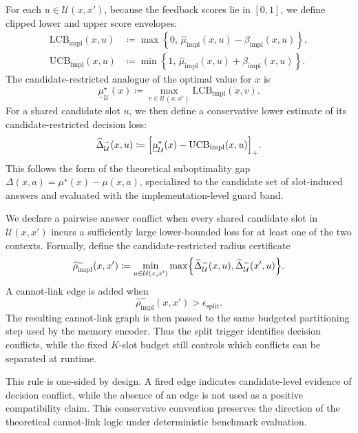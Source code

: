 \documentclass{article}
\theoremstyle{plain}
\theoremstyle{definition}
\theoremstyle{remark}
\begin{document}
For each \(u\in\mathcal U(x,x')\), because the feedback scores lie in
\([0,1]\), we define clipped lower and upper score envelopes:
\[
\begin{aligned}
\mathrm{LCB}_{\mathrm{impl}}(x,u)
&\coloneqq
\max\!\left\{0,\,
\widehat\mu_{\mathrm{impl}}(x,u)-\beta_{\mathrm{impl}}(x,u)
\right\},\\
\mathrm{UCB}_{\mathrm{impl}}(x,u)
&\coloneqq
\min\!\left\{1,\,
\widehat\mu_{\mathrm{impl}}(x,u)+\beta_{\mathrm{impl}}(x,u)
\right\}.
\end{aligned}
\]
The candidate-restricted analogue of the optimal value for \(x\) is
\[
\underline{\mu}^{\star}_{\mathcal U}(x)
\coloneqq
\max_{v\in\mathcal U(x,x')}
\mathrm{LCB}_{\mathrm{impl}}(x,v).
\]
For a shared candidate slot \(u\), we then define a conservative lower
estimate of its candidate-restricted decision loss:
\[
\widehat\Delta^{-}_{\mathcal U}(x,u)
\coloneqq
\Bigl[
\underline{\mu}^{\star}_{\mathcal U}(x)
-
\mathrm{UCB}_{\mathrm{impl}}(x,u)
\Bigr]_+ .
\]
This follows the form of the theoretical suboptimality gap
\(\Delta(x,a)=\mu^\star(x)-\mu(x,a)\), specialized to the candidate set of
slot-induced answers and evaluated with the implementation-level guard band.

We declare a pairwise answer conflict when every shared candidate slot
in \(\mathcal U(x,x')\) incurs a sufficiently large lower-bounded loss for
at least one of the two contexts. Formally, define the candidate-restricted radius certificate
\[
\widehat\rho^{-}_{\mathrm{impl}}(x,x')
\coloneqq
\min_{u\in\mathcal U(x,x')}
\max\Bigl\{
\widehat\Delta^{-}_{\mathcal U}(x,u),
\widehat\Delta^{-}_{\mathcal U}(x',u)
\Bigr\}.
\]
A cannot-link edge is added when
\begin{equation}
\label{eq:impl-split-trigger}
\widehat\rho^{-}_{\mathrm{impl}}(x,x')
>
\epsilon_{\mathrm{split}} .
\end{equation}
The resulting cannot-link graph is then passed to the same budgeted
partitioning step used by the memory encoder. Thus the split trigger
identifies decision conflicts, while the fixed \(K\)-slot budget still
controls which conflicts can be separated at runtime.

This rule is one-sided by design. A fired edge indicates candidate-level
evidence of decision conflict, while the absence of an edge is not used as a
positive compatibility claim. This conservative convention preserves the
direction of the theoretical cannot-link logic under deterministic benchmark
evaluation.
\end{document}
